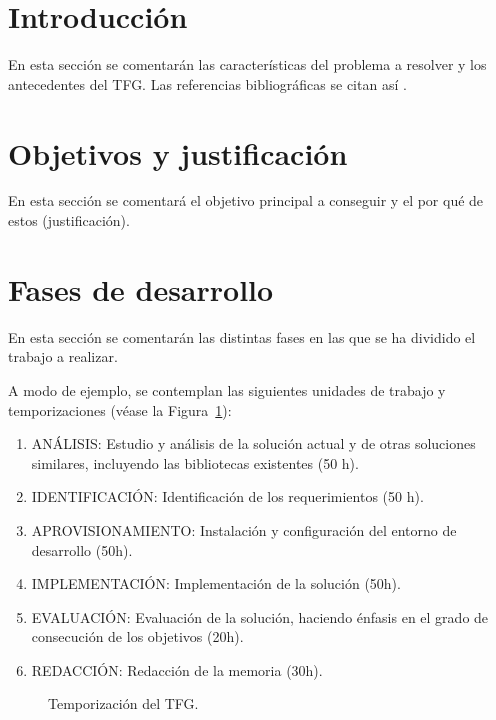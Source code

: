 \documentclass[titlepage, 12pt, a4paper, oneside]{article}
\begin{document}
\normalsize

\section{Introducción}
En esta sección se comentarán las características del problema a resolver y los antecedentes del TFG. Las referencias bibliográficas se citan así \cite{einstein1922kosmologische}.

\section{Objetivos y justificación}
En esta sección se comentará el objetivo principal a conseguir y el por qué de estos (justificación).

\section{Fases de desarrollo}
En esta sección se comentarán las distintas fases en las que se ha
dividido el trabajo a realizar.

A modo de ejemplo, se contemplan las siguientes unidades de trabajo y
temporizaciones (véase la Figura~\ref{fig:temporizacion}):
\begin{enumerate}
  \item {ANÁLISIS:} Estudio y análisis de la solución actual y de
    otras soluciones similares, incluyendo las bibliotecas existentes
    (50 h).
  \item {IDENTIFICACIÓN}: Identificación de los requerimientos (50 h).
  \item {APROVISIONAMIENTO}: Instalación y configuración del entorno
    de desarrollo (50h).
  \item {IMPLEMENTACIÓN}: Implementación de la solución (50h).
  \item {EVALUACIÓN}: Evaluación de la solución, haciendo énfasis en
    el grado de consecución de los objetivos (20h).
  \item {REDACCIÓN}: Redacción de la memoria (30h).
\end{enumerate}

\begin{figure}
  \begin{center}
  \end{center}
  \caption{Temporización del TFG.\label{fig:temporizacion}}
\end{figure}
\end{document}
